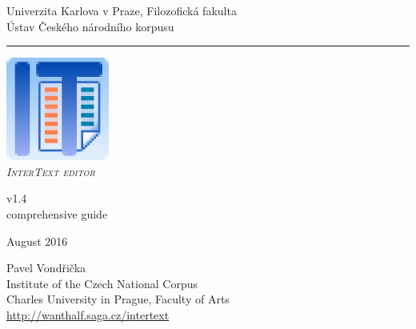 \documentclass[a4paper,10pt,oneside]{book}
\newcommand{\ITeditor}{\textit{\textsc{InterText editor}}\xspace}
\begin{document}
\begin{titlepage}
\begin{center}

\begin{Large}
Univerzita Karlova v Praze, Filozofická fakulta \\
Ústav Českého národního korpusu
\end{Large}
\rule{\linewidth}{0.5mm}

\vspace*{4cm}

\begin{Huge}
\includegraphics[width=4ex]{icon.png}\\
\vspace*{1cm}
\ITeditor
\end{Huge}

\begin{huge}
v1.4\\
\medskip
comprehensive guide
\end{huge}
\bigskip

\begin{Large}
August 2016\\
\end{Large}



\bigskip

\vspace*{2.5cm}

\begin{Large}
Pavel Vondřička\\
Institute of the Czech National Corpus\\
Charles University in Prague, Faculty of Arts\\
\bigskip
\url{http://wanthalf.saga.cz/intertext}
\end{Large}

\end{center}

\end{titlepage}
\thispagestyle{empty}
\end{document}
